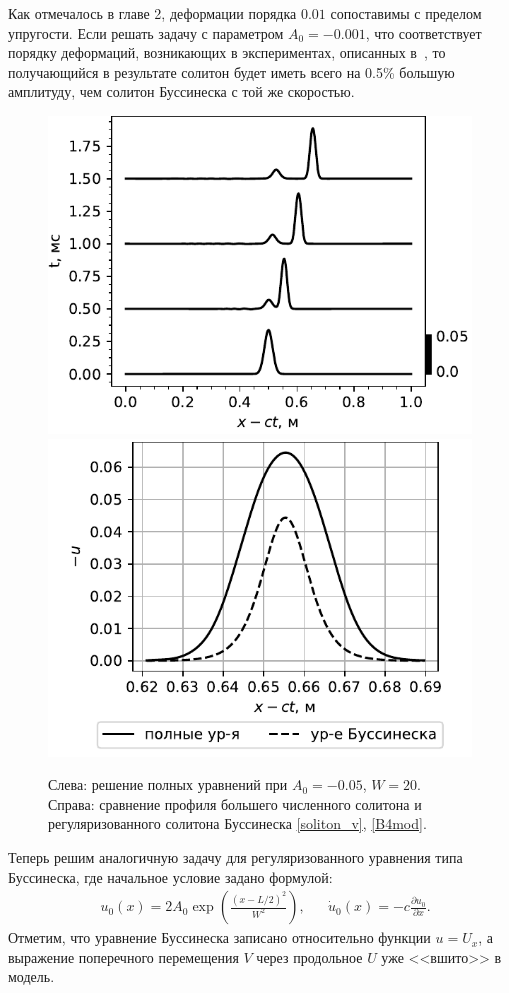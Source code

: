 \documentclass[12pt, a4paper]{report}
\newcommand{\lb}{\left (}
\newcommand{\rb}{\right )}
\newcommand{\pdiff}[2]{\frac{\partial #1}{\partial #2}}
\begin{document}
Как отмечалось в главе 2, деформации порядка $0.01$ сопоставимы с пределом упругости. Если решать задачу с параметром $A_0 = -0.001$, что соответствует порядку деформаций, возникающих в экспериментах, описанных в~\cite{Garbuzov}, то получающийся в результате солитон будет иметь всего на 0.5\% большую амплитуду, чем солитон Буссинеска с той же скоростью.
\begin{figure}[h!]
	\centering
	\includegraphics[width=0.48\linewidth]{figures/SolEvolSmall2}
	\includegraphics[width=0.48\linewidth]{figures/SolCompareSmall2}
	\caption{Слева: решение полных уравнений при $A_0=-0.05$, $W=20$. Справа: сравнение профиля большего численного солитона и регуляризованного солитона Буссинеска \eqref{soliton_v}, \eqref{B4mod}.}
	\label{fig:evolution2}
\end{figure}

Теперь решим аналогичную задачу для регуляризованного уравнения типа Буссинеска, где начальное условие задано формулой:
\begin{align}
\label{3_bq_ic}
& u_0 (x) = 2A_0 \exp\lb \frac{(x - L/2)^2}{W^2}\rb,&  &\dot{u}_0 (x) = -c \pdiff{u_0}{x}.
\end{align}
Отметим, что уравнение Буссинеска записано относительно функции $u = U_{x}$, а выражение поперечного перемещения $V$ через продольное $U$ уже <<вшито>> в модель.
\end{document}

